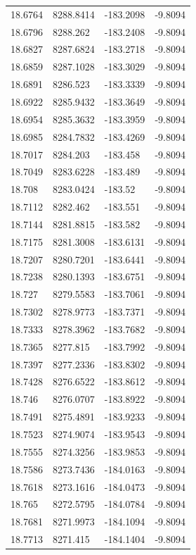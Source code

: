 \begin{table}[H]
\begin{tabular}{llll}
18.6764 & 8288.8414 & -183.2098 & -9.8094 \\
18.6796 & 8288.262 & -183.2408 & -9.8094 \\
18.6827 & 8287.6824 & -183.2718 & -9.8094 \\
18.6859 & 8287.1028 & -183.3029 & -9.8094 \\
18.6891 & 8286.523 & -183.3339 & -9.8094 \\
18.6922 & 8285.9432 & -183.3649 & -9.8094 \\
18.6954 & 8285.3632 & -183.3959 & -9.8094 \\
18.6985 & 8284.7832 & -183.4269 & -9.8094 \\
18.7017 & 8284.203 & -183.458 & -9.8094 \\
18.7049 & 8283.6228 & -183.489 & -9.8094 \\
18.708 & 8283.0424 & -183.52 & -9.8094 \\
18.7112 & 8282.462 & -183.551 & -9.8094 \\
18.7144 & 8281.8815 & -183.582 & -9.8094 \\
18.7175 & 8281.3008 & -183.6131 & -9.8094 \\
18.7207 & 8280.7201 & -183.6441 & -9.8094 \\
18.7238 & 8280.1393 & -183.6751 & -9.8094 \\
18.727 & 8279.5583 & -183.7061 & -9.8094 \\
18.7302 & 8278.9773 & -183.7371 & -9.8094 \\
18.7333 & 8278.3962 & -183.7682 & -9.8094 \\
18.7365 & 8277.815 & -183.7992 & -9.8094 \\
18.7397 & 8277.2336 & -183.8302 & -9.8094 \\
18.7428 & 8276.6522 & -183.8612 & -9.8094 \\
18.746 & 8276.0707 & -183.8922 & -9.8094 \\
18.7491 & 8275.4891 & -183.9233 & -9.8094 \\
18.7523 & 8274.9074 & -183.9543 & -9.8094 \\
18.7555 & 8274.3256 & -183.9853 & -9.8094 \\
18.7586 & 8273.7436 & -184.0163 & -9.8094 \\
18.7618 & 8273.1616 & -184.0473 & -9.8094 \\
18.765 & 8272.5795 & -184.0784 & -9.8094 \\
18.7681 & 8271.9973 & -184.1094 & -9.8094 \\
18.7713 & 8271.415 & -184.1404 & -9.8094 \\

\end{tabular}
\end{table}
